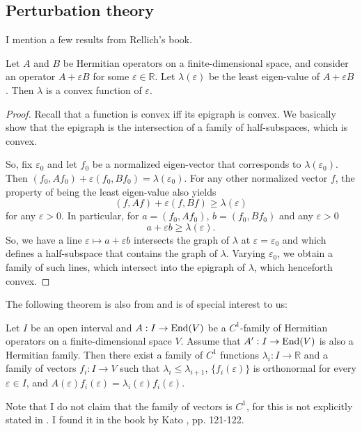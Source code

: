 \subsection{Perturbation theory}
I mention a few results from Rellich's \cite{rellich} book.
\begin{proposition}\label{p:conv_le}
Let $A$ and $B$ be Hermitian operators on a finite-dimensional space, and consider an operator $A + \varepsilon B$ for some $\varepsilon \in \mathbb R$. Let $\lambda(\varepsilon)$ be the least eigen-value of $A+\varepsilon B$. Then $\lambda$ is a convex function of $\varepsilon$.
\end{proposition}
\begin{proof}
Recall that a function is convex iff its epigraph is convex. We basically show that the epigraph is the intersection of a family of half-subspaces, which is convex.

So, fix $\varepsilon_0$ and let $f_0$ be a normalized eigen-vector that corresponds to $\lambda(\varepsilon_0)$. Then $(f_0,Af_0) + \varepsilon (f_0, Bf_0) = \lambda(\varepsilon_0)$. For any other normalized vector $f$, the property of being the least eigen-value also yields
\[
(f,Af) + \varepsilon (f, Bf) \geq \lambda(\varepsilon)
\]
for any $\varepsilon > 0$. In particular, for $a = (f_0,Af_0)$, $b = (f_0,Bf_0)$ and any $\varepsilon > 0$
\[
a + \varepsilon b \geq \lambda(\varepsilon).
\]
So, we have a line $\varepsilon \mapsto a+\varepsilon b$ intersects the graph of $\lambda$ at $\varepsilon = \varepsilon_0$ and which defines a half-subspace that contains the graph of $\lambda$. Varying $\varepsilon_0$, we obtain a family of such lines, which intersect into the epigraph of $\lambda$, which henceforth convex.
\end{proof}

The following theorem is also from \cite{rellich} and is of special interest to us:
\begin{theorem}\label{thm:pert}
Let $I$ be an open interval and $A : I \rightarrow \operatorname{End}(V)$ be a $C^1$-family of Hermitian operators on a finite-dimensional space $V$. Assume that $A^\prime : I \rightarrow \operatorname{End}(V)$ is also a Hermitian family. Then there exist a family of $C^1$ functions $\lambda_i : I \rightarrow \mathbb R$ and a family of vectors $f_i : I \rightarrow V$ such that $\lambda_i \leq \lambda_{i+1}$, $\{f_i(\varepsilon)\}$ is orthonormal for every $\varepsilon \in I$, and $A(\varepsilon) f_i(\varepsilon) = \lambda_i(\varepsilon)f_i(\varepsilon)$.
\end{theorem}
Note that I do not claim that the family of vectors is $C^1$, for this is not explicitly stated in \cite{rellich}. I found it in the book by Kato \cite{kato}, pp. 121-122.